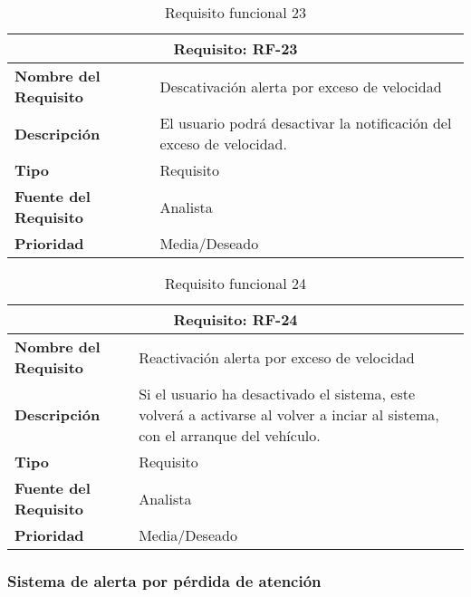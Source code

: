 \begin{table}[H]
\begin{center}
\begin{tabular}{p{} p{7cm}}
\multicolumn{2}{c}{\textbf{Requisito: RF-23} } \\
\hline \hline
\textbf{Nombre del Requisito} & Descativación alerta por exceso de velocidad \\
\hline
\textbf{Descripción} & El usuario podrá desactivar la notificación del exceso de velocidad. \\
\hline
\textbf{Tipo} & Requisito  \\
\hline
\textbf{Fuente del Requisito} & Analista  \\
\hline
\textbf{Prioridad} & Media/Deseado  \\ \hline
\end{tabular}
\caption{Requisito funcional 23}
\label{tab:RF-23}
\end{center}
\end{table}

\begin{table}[H]
\begin{center}
\begin{tabular}{p{} p{7cm}}
\multicolumn{2}{c}{\textbf{Requisito: RF-24} } \\
\hline \hline
\textbf{Nombre del Requisito} & Reactivación alerta por exceso de  velocidad \\
\hline
\textbf{Descripción} & Si el usuario ha desactivado el sistema, este volverá a activarse al volver a inciar al sistema, con el arranque del vehículo. \\
\hline
\textbf{Tipo} & Requisito  \\
\hline
\textbf{Fuente del Requisito} & Analista  \\
\hline
\textbf{Prioridad} & Media/Deseado  \\ \hline
\end{tabular}
\caption{Requisito funcional 24}
\label{tab:RF-24}
\end{center}
\end{table}

\clearpage
\subsubsection{Sistema de alerta por pérdida de atención}

